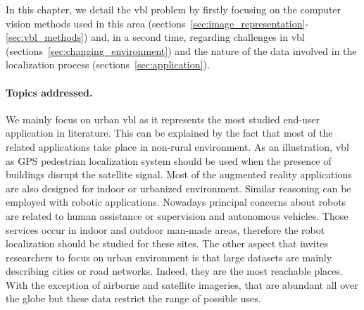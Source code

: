 \label{sec:introduction}
	
	In this chapter, we detail the \ac{vbl} problem by firstly focusing on the computer vision methods used in this area (sections~\ref{sec:image_representation}-\ref{sec:vbl_methods}) and, in a second time, regarding challenges in \ac{vbl} (sections~\ref{sec:changing_environment}) and the nature of the data involved in the localization process (sections~\ref{sec:application}).
	
	\paragraph{Topics addressed.}
		We mainly focus on urban \ac{vbl} as it represents the most studied end-user application in literature. This can be explained by the fact that most of the related applications take place in non-rural environment. As an illustration, \ac{vbl} as GPS pedestrian localization system should be used when the presence of buildings disrupt the satellite signal. Most of the augmented reality applications are also designed for indoor or urbanized environment. Similar reasoning can be employed with robotic applications. Nowadays principal concerns about robots are related to human assistance or supervision and autonomous vehicles. Those services occur in indoor and outdoor man-made areas, therefore the robot localization should be studied for these sites. The other aspect that invites researchers to focus on urban environment is that large datasets are mainly describing cities or road networks. Indeed, they are the most reachable places. With the exception of airborne and satellite imageries, that are abundant all over the globe but these data restrict the range of possible uses.
				
